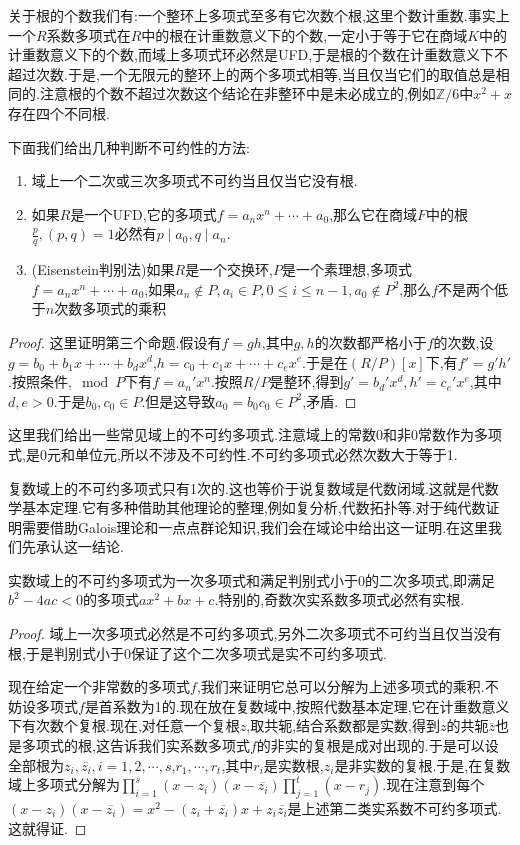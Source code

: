 关于根的个数我们有:一个整环上多项式至多有它次数个根,这里个数计重数.事实上一个$R$系数多项式在$R$中的根在计重数意义下的个数,一定小于等于它在商域$K$中的计重数意义下的个数,而域上多项式环必然是UFD,于是根的个数在计重数意义下不超过次数.于是,一个无限元的整环上的两个多项式相等,当且仅当它们的取值总是相同的.注意根的个数不超过次数这个结论在非整环中是未必成立的,例如$\mathbb{Z}/6$中$x^2+x$存在四个不同根.

下面我们给出几种判断不可约性的方法:
\begin{enumerate}
	\item 域上一个二次或三次多项式不可约当且仅当它没有根.
	\item 如果$R$是一个UFD,它的多项式$f=a_nx^n+\cdots+a_0$,那么它在商域$F$中的根$\frac{p}{q},(p,q)=1$必然有$p\mid a_0,q\mid a_n$.
	\item (Eisenstein判别法)如果$R$是一个交换环,$P$是一个素理想,多项式$f=a_nx^n+\cdots+a_0$,如果$a_n\not\in P,a_i\in P,0\le i\le n-1,a_0\not\in P^2$,那么$f$不是两个低于$n$次数多项式的乘积
\end{enumerate}
\begin{proof}
	
	这里证明第三个命题.假设有$f=gh$,其中$g,h$的次数都严格小于$f$的次数,设$g=b_0+b_1x+\cdots+b_dx^d$,$h=c_0+c_1x+\cdots+c_ex^e$.于是在$(R/P)[x]$下,有$f'=g'h'$.按照条件,$\mod P$下有$f=a_n'x^n$.按照$R/P$是整环,得到$g'=b_d'x^d,h'=c_e'x^e$,其中$d,e>0$.于是$b_0,c_0\in P$.但是这导致$a_0=b_0c_0\in P^2$,矛盾.
\end{proof}

这里我们给出一些常见域上的不可约多项式.注意域上的常数0和非0常数作为多项式,是0元和单位元,所以不涉及不可约性.不可约多项式必然次数大于等于1.

复数域上的不可约多项式只有1次的.这也等价于说复数域是代数闭域.这就是代数学基本定理.它有多种借助其他理论的整理,例如复分析,代数拓扑等.对于纯代数证明需要借助Galois理论和一点点群论知识,我们会在域论中给出这一证明.在这里我们先承认这一结论.

实数域上的不可约多项式为一次多项式和满足判别式小于0的二次多项式,即满足$b^2-4ac<0$的多项式$ax^2+bx+c$.特别的,奇数次实系数多项式必然有实根.
\begin{proof}
	
	域上一次多项式必然是不可约多项式,另外二次多项式不可约当且仅当没有根,于是判别式小于0保证了这个二次多项式是实不可约多项式.
	
	现在给定一个非常数的多项式$f$,我们来证明它总可以分解为上述多项式的乘积.不妨设多项式$f$是首系数为1的.现在放在复数域中,按照代数基本定理,它在计重数意义下有次数个复根.现在,对任意一个复根$z$,取共轭,结合系数都是实数,得到$z$的共轭$\overline{z}$也是多项式的根,这告诉我们实系数多项式$f$的非实的复根是成对出现的.于是可以设全部根为$z_i,\overline{z_i},i=1,2,\cdots,s$,$r_1,\cdots,r_t$,其中$r_i$是实数根,$z_i$是非实数的复根.于是,在复数域上多项式分解为$\prod_{i=1}^s(x-z_i) (x-\overline{z_i})\prod_{j=1}^{t}(x-r_j)$.现在注意到每个$(x-z_i)(x-\overline{z_i})=x^2-(z_i+\overline{z_i})x+z_i\overline{z_i}$是上述第二类实系数不可约多项式.这就得证.
\end{proof}

